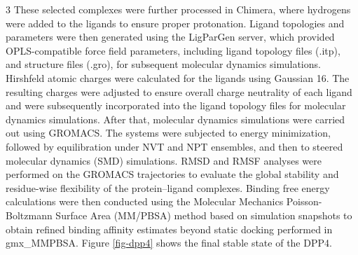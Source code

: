 \documentclass[portrait,final,20pt,ra0]{sciposter}
\begin{document}
\begin{multicols*}{3}
These selected complexes were further processed in Chimera, where hydrogens were added to the ligands to ensure proper protonation. Ligand topologies and parameters were then generated using the LigParGen server, which provided OPLS-compatible force field parameters, including ligand topology files (.itp), and structure files (.gro), for subsequent molecular dynamics simulations. Hirshfeld atomic charges were calculated for the ligands using Gaussian 16. The resulting charges were adjusted to ensure overall charge neutrality of each ligand and were subsequently incorporated into the ligand topology files for molecular dynamics simulations. After that, molecular dynamics simulations were carried out using GROMACS. The systems were subjected to energy minimization, followed by equilibration under NVT and NPT ensembles, and then to steered molecular dynamics (SMD) simulations. RMSD and RMSF analyses were performed on the GROMACS trajectories to evaluate the global stability and residue-wise flexibility of the protein–ligand complexes. Binding free energy calculations were then conducted using the Molecular Mechanics Poisson-Boltzmann Surface Area (MM/PBSA) method based on simulation snapshots to obtain refined binding affinity estimates beyond static docking performed in gmx\_MMPBSA. \newline\newline Figure \ref{fig-dpp4} shows the final stable state of the DPP4.



\end{multicols*}
\end{document}
